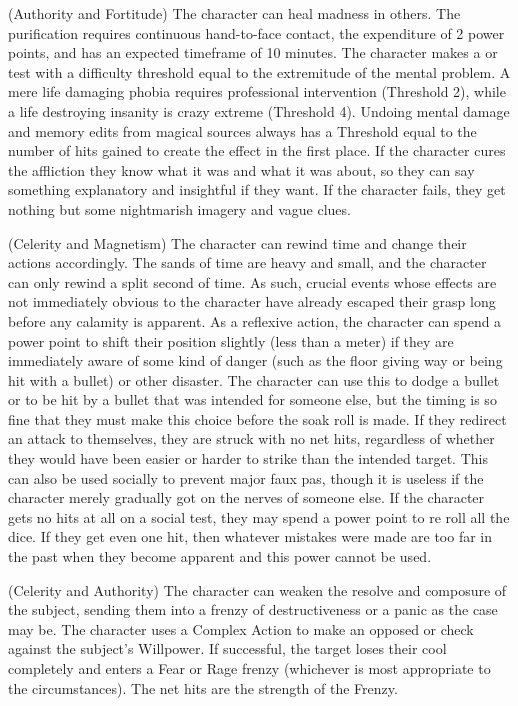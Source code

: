 (Authority and Fortitude)
The character can heal madness in others. The purification requires continuous hand-to-face contact,  the expenditure of 2 power points, and has an expected timeframe of 10 minutes. The character makes a  or  test with a difficulty threshold equal to the extremitude of the mental problem. A mere life damaging phobia requires professional intervention (Threshold 2), while a life destroying insanity is crazy extreme (Threshold 4). Undoing mental damage and memory edits from magical sources always has a Threshold equal to the number of hits gained to create the effect in the first place. If the character cures the affliction they know what it was and what it was about, so they can say something explanatory and insightful if they want. If the character fails, they get nothing but some nightmarish imagery and vague clues.

 (Celerity and Magnetism)
The character can rewind time and change their actions accordingly. The sands of time are heavy and small, and the character can only rewind a split second of time. As such, crucial events whose effects are not immediately obvious to the character have already escaped their grasp long before any calamity is apparent. As a reflexive action, the character can spend a power point to shift their position slightly (less than a meter) if they are immediately aware of some kind of danger (such as the floor giving way or being hit with a bullet) or other disaster. The character can use this to dodge a bullet or to be hit by a bullet that was intended for someone else, but the timing is so fine that they must make this choice before the soak roll is made. If they redirect an attack to themselves, they are struck with no net hits, regardless of whether they would have been easier or harder to strike than the intended target. This can also be used socially to prevent major faux pas, though it is useless if the character merely gradually got on the nerves of someone else. If the character gets no hits at all on a social test, they may spend a power point to re roll all the dice. If they get even one hit, then whatever mistakes were made are too far in the past when they become apparent and this power cannot be used.

 (Celerity and Authority)
The character can weaken the resolve and composure of the subject, sending them into a frenzy of destructiveness or a panic as the case may be. The character uses a Complex Action to make an opposed  or  check against the subject's Willpower. If successful, the target loses their cool completely and enters a Fear or Rage frenzy (whichever is most appropriate to the circumstances). The net hits are the strength of the Frenzy.

